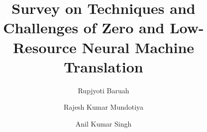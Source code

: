 \documentclass[manuscript,screen]{acmart}
\begin{document}
\title{Survey on Techniques and Challenges of Zero and Low-Resource Neural Machine Translation}

\author{Rupjyoti Baruah}

\author{Rajesh Kumar Mundotiya}

\author{Anil Kumar Singh}
\renewcommand{\shortauthors}{Baruah et al.}

\end{document}
